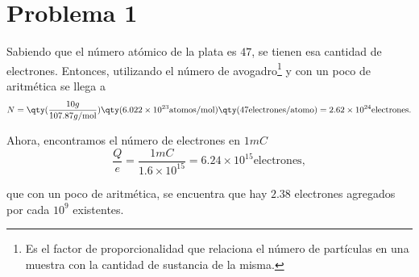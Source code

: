 \section*{Problema 1}
Sabiendo que el número atómico de la plata es $47$, se tienen esa cantidad de electrones. Entonces, utilizando el número de avogadro\footnote{Es el factor de proporcionalidad que relaciona el número de partículas en una muestra con la cantidad de sustancia de la misma.} y con un poco de aritmética se llega a
	$$ N = \qty(\frac{10g}{107.87g/\text{mol}}) \qty(6.022\times 10^{23} \text{atomos}/\text{mol}) \qty(47 \text{electrones}/\text{atomo}) = 2.62\times 10^{24} \text{electrones}. $$
	
Ahora, encontramos el número de electrones en $1mC$
	$$ \frac{Q}{e} = \frac{1mC}{1.6\times 10^{15}} = 6.24\times 10^{15} \text{electrones}, $$

que con un poco de aritmética, se encuentra que hay $2.38$ electrones agregados por cada $10^9$ existentes.